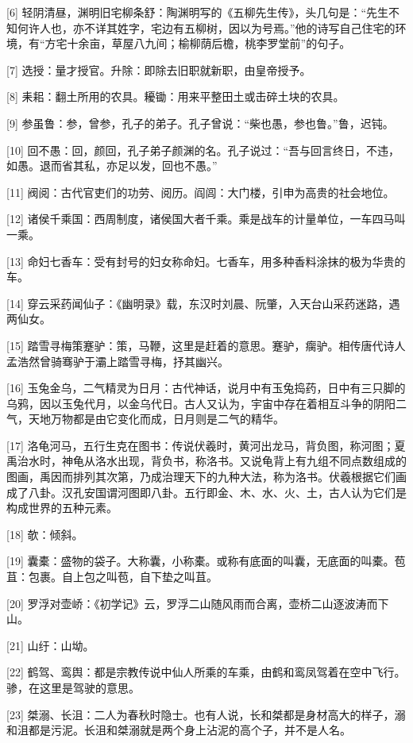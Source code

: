 \documentclass[12pt,UTF8]{ctexbook}
\begin{document}
[6] 轻阴清昼，渊明旧宅柳条舒：陶渊明写的《五柳先生传》，头几句是：“先生不知何许人也，亦不详其姓字，宅边有五柳树，因以为号焉。”他的诗写自己住宅的环境，有“方宅十余亩，草屋八九间；榆柳荫后檐，桃李罗堂前”的句子。

[7] 选授：量才授官。升除：即除去旧职就新职，由皇帝授予。

[8] 耒耜：翻土所用的农具。耰锄：用来平整田土或击碎土块的农具。

[9] 参虽鲁：参，曾参，孔子的弟子。孔子曾说：“柴也愚，参也鲁。”鲁，迟钝。

[10] 回不愚：回，颜回，孔子弟子颜渊的名。孔子说过：“吾与回言终日，不违，如愚。退而省其私，亦足以发，回也不愚。”

[11] 阀阅：古代官吏们的功劳、阅历。阎闾：大门楼，引申为高贵的社会地位。

[12] 诸侯千乘国：西周制度，诸侯国大者千乘。乘是战车的计量单位，一车四马叫一乘。

[13] 命妇七香车：受有封号的妇女称命妇。七香车，用多种香料涂抹的极为华贵的车。

[14] 穿云采药闻仙子：《幽明录》载，东汉时刘晨、阮肇，入天台山采药迷路，遇两仙女。

[15] 踏雪寻梅策蹇驴：策，马鞭，这里是赶着的意思。蹇驴，瘸驴。相传唐代诗人孟浩然曾骑骞驴于灞上踏雪寻梅，抒其幽兴。

[16] 玉兔金乌，二气精灵为日月：古代神话，说月中有玉兔捣药，日中有三只脚的乌鸦，因以玉兔代月，以金乌代日。古人又认为，宇宙中存在着相互斗争的阴阳二气，天地万物都是由它变化而成，日月则是二气的精华。

[17] 洛龟河马，五行生克在图书：传说伏羲时，黄河出龙马，背负图，称河图；夏禹治水时，神龟从洛水出现，背负书，称洛书。又说龟背上有九组不同点数组成的图画，禹因而排列其次第，乃成治理天下的九种大法，称为洛书。伏羲根据它们画成了八卦。汉孔安国谓河图即八卦。五行即金、木、水、火、土，古人认为它们是构成世界的五种元素。

[18] 欹：倾斜。

[19] 囊橐：盛物的袋子。大称囊，小称橐。或称有底面的叫囊，无底面的叫橐。苞苴：包裹。自上包之叫苞，自下垫之叫苴。

[20] 罗浮对壶峤：《初学记》云，罗浮二山随风雨而合离，壶桥二山逐波涛而下山。

[21] 山纡：山坳。

[22] 鹤驾、鸾舆：都是宗教传说中仙人所乘的车乘，由鹤和鸾凤驾着在空中飞行。骖，在这里是驾驶的意思。

[23] 桀溺、长沮：二人为春秋时隐士。也有人说，长和桀都是身材高大的样子，溺和沮都是污泥。长沮和桀溺就是两个身上沾泥的高个子，并不是人名。
\end{document}
